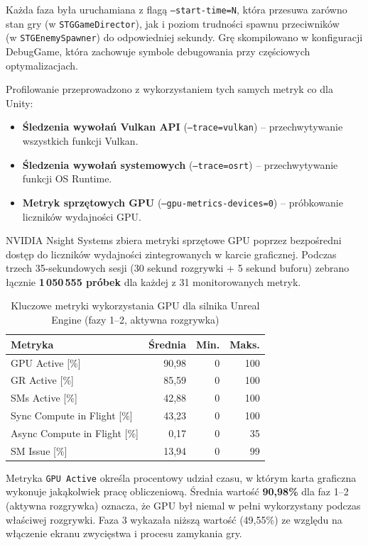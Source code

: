 Każda faza była uruchamiana z flagą \texttt{--start-time=N}, 
która przesuwa zarówno stan gry
(w \texttt{STGGameDirector}), jak i poziom trudności spawnu przeciwników 
\\ (w \texttt{STGEnemySpawner}) 
do odpowiedniej sekundy.
Grę skompilowano w konfiguracji DebugGame, która zachowuje symbole debugowania przy częściowych optymalizacjach.

Profilowanie przeprowadzono z wykorzystaniem tych samych metryk co dla Unity:
\begin{itemize}
    \item \textbf{Śledzenia wywołań Vulkan API} (\texttt{--trace=vulkan}) -- przechwytywanie wszystkich funkcji Vulkan.
    \item \textbf{Śledzenia wywołań systemowych} (\texttt{--trace=osrt}) -- przechwytywanie funkcji OS Runtime.
    \item \textbf{Metryk sprzętowych GPU} (\texttt{--gpu-metrics-devices=0}) -- próbkowanie liczników wydajności GPU.
\end{itemize}


NVIDIA Nsight Systems zbiera metryki sprzętowe GPU poprzez bezpośredni dostęp do liczników 
wydajności zintegrowanych w karcie graficznej. 
Podczas trzech 35-sekundowych sesji (30 sekund rozgrywki + 5 sekund buforu) zebrano łącznie \textbf{1\,050\,555 próbek} dla każdej z 
31 monitorowanych metryk.

\begin{table}[H]
\centering
\caption{Kluczowe metryki wykorzystania GPU dla silnika Unreal Engine (fazy 1--2, aktywna rozgrywka)}
\label{tab:unreal-gpu-metrics}
\begin{tabular}{|l|r|r|r|}
\hline
\textbf{Metryka} & \textbf{Średnia} & \textbf{Min.} & \textbf{Maks.} \\
\hline
GPU Active [\%] & 90,98 & 0 & 100 \\
GR Active [\%] & 85,59 & 0 & 100 \\
SMs Active [\%] & 42,88 & 0 & 100 \\
Sync Compute in Flight [\%] & 43,23 & 0 & 100 \\
Async Compute in Flight [\%] & 0,17 & 0 & 35 \\
SM Issue [\%] & 13,94 & 0 & 99 \\
\hline
\end{tabular}
\end{table}

Metryka \texttt{GPU Active} określa procentowy udział czasu, w którym karta graficzna wykonuje jakąkolwiek pracę obliczeniową. 
Średnia wartość \textbf{90,98\%} dla faz 1--2 (aktywna rozgrywka) oznacza, że GPU był niemal w pełni wykorzystany podczas właściwej rozgrywki. 
Faza 3 wykazała niższą wartość (49,55\%) ze względu na włączenie ekranu zwycięstwa i procesu zamykania gry.

